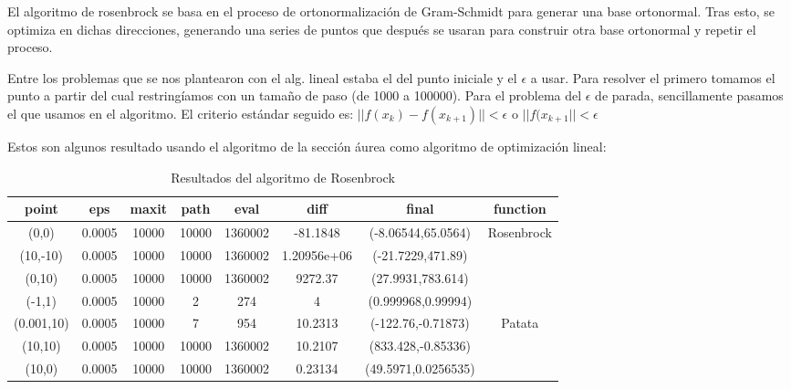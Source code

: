 El algoritmo de rosenbrock se basa en el proceso de ortonormalización de Gram-Schmidt para generar una base ortonormal. Tras esto, se optimiza en dichas direcciones, generando una series de puntos que después se usaran para construir otra base ortonormal y repetir el proceso.

Entre los problemas que se nos plantearon con el alg. lineal estaba el del punto iniciale y el $\epsilon$ a usar. Para resolver el primero tomamos el punto a partir del cual restringíamos con un tamaño de paso (de 1000 a 100000). Para el problema del $\epsilon$ de parada, sencillamente pasamos el que usamos en el algoritmo. El criterio estándar seguido es: $|| f(x_k) - f(x_{k+1}) || < \epsilon$  o $|| f(x_{k+1} ||< \epsilon$


Estos son algunos resultado usando el algoritmo de la sección áurea como algoritmo de optimización lineal:
\begin{table}[H]
\hfill\begin{tabular}{|c|cccccc|c|} \hline
\bf point  & \bf eps & \bf maxit & \bf path & \bf eval & \bf diff    & \bf final           & \bf function                \\\hline\hline
(0,0)      & 0.0005  & 10000     & 10000    & 1360002  & -81.1848    & (-8.06544,65.0564)  & \multirow{4}{*}{Rosenbrock} \\
(10,-10)   & 0.0005  & 10000     & 10000    & 1360002  & 1.20956e+06 & (-21.7229,471.89)   &                             \\
(0,10)     & 0.0005  & 10000     & 10000    & 1360002  & 9272.37     & (27.9931,783.614)   &                             \\
(-1,1)     & 0.0005  & 10000     & 2        & 274      & 4           & (0.999968,0.99994)  &                             \\\hline\hline
(0.001,10) & 0.0005  & 10000     & 7        & 954      & 10.2313     & (-122.76,-0.71873)  & \multirow{3}{*}{Patata}     \\
(10,10)    & 0.0005  & 10000     & 10000    & 1360002  & 10.2107     & (833.428,-0.85336)  &                             \\
(10,0)     & 0.0005  & 10000     & 10000    & 1360002  & 0.23134     & (49.5971,0.0256535) &                             \\\hline
\end{tabular}\hfill\hbox{}
\caption{Resultados del algoritmo de Rosenbrock}
\end{table}
\vspace{-1em}

